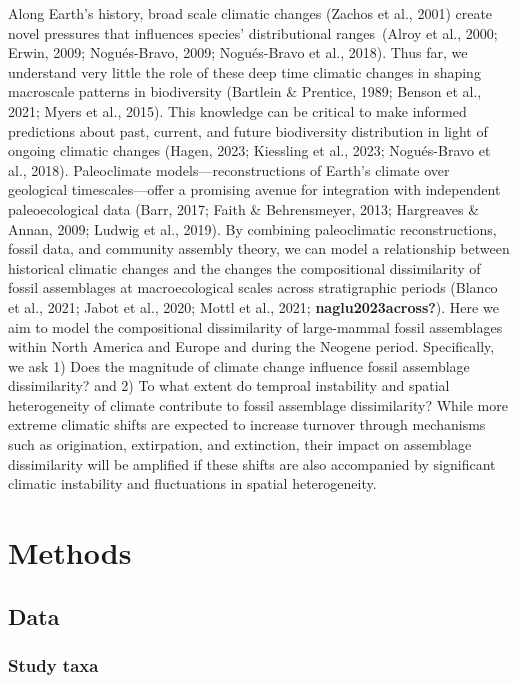 \documentclass[
]{agujournal2019}
\begin{document}
Along Earth's history, broad scale climatic changes (Zachos et al.,
2001) create novel pressures that influences species' distributional
ranges~(Alroy et al., 2000; Erwin, 2009; Nogués-Bravo, 2009;
Nogués-Bravo et al., 2018). Thus far, we understand very little the role
of these deep time climatic changes in shaping macroscale patterns in
biodiversity (Bartlein \& Prentice, 1989; Benson et al., 2021; Myers et
al., 2015). This knowledge can be critical to make informed predictions
about past, current, and future biodiversity distribution in light of
ongoing climatic changes (Hagen, 2023; Kiessling et al., 2023;
Nogués-Bravo et al., 2018). Paleoclimate models---reconstructions of
Earth's climate over geological timescales---offer a promising avenue
for integration with independent paleoecological data (Barr, 2017; Faith
\& Behrensmeyer, 2013; Hargreaves \& Annan, 2009; Ludwig et al., 2019).
By combining paleoclimatic reconstructions, fossil data, and community
assembly theory, we can model a relationship between historical climatic
changes and the changes the compositional dissimilarity of fossil
assemblages at macroecological scales across stratigraphic periods
(Blanco et al., 2021; Jabot et al., 2020; Mottl et al., 2021;
\textbf{naglu2023across?}). Here we aim to model the compositional
dissimilarity of large-mammal fossil assemblages within North America
and Europe and during the Neogene period. Specifically, we ask 1) Does
the magnitude of climate change influence fossil assemblage
dissimilarity? and 2) To what extent do temproal instability and spatial
heterogeneity of climate contribute to fossil assemblage dissimilarity?
While more extreme climatic shifts are expected to increase turnover
through mechanisms such as origination, extirpation, and extinction,
their impact on assemblage dissimilarity will be amplified if these
shifts are also accompanied by significant climatic instability and
fluctuations in spatial heterogeneity.

\section{Methods}\label{methods}

\subsection{Data}\label{data}

\subsubsection{Study taxa}\label{study-taxa}
\end{document}
